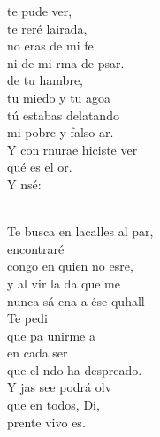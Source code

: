 \documentclass[12pt]{article}
\begin{document}
\begin{multicols*}{2}
\begin{cancion}%
	 te pude ver,\\
	te reré lairada,\\
no eras de mi fe \\
	ni de mi rma de psar.\\
	 de tu hambre, \\
	tu miedo y tu agoa \\
tú estabas delatando\\
	mi pobre y falso ar.\\
	Y con rnurae hiciste ver \\
	qué es el or.\\
	Y nsé:\\\jump\\
	\begin{chorus}%
	Te busca en lacalles al par,\\
	 encontraré \\
	congo en quien no esre,\\
	y al vir la da que me \\
	nunca sá ena a ése quhall\\
	Te pedi \\
	que pa unirme a      \\
en cada ser\\
	que el ndo ha despreado.\\
	Y jas see podrá olv \\
	que en todos, Di,\\
	prente vivo es. \\
	\end{chorus}%
	\jump\\
\end{cancion}%


\end{multicols*}
\end{document}
